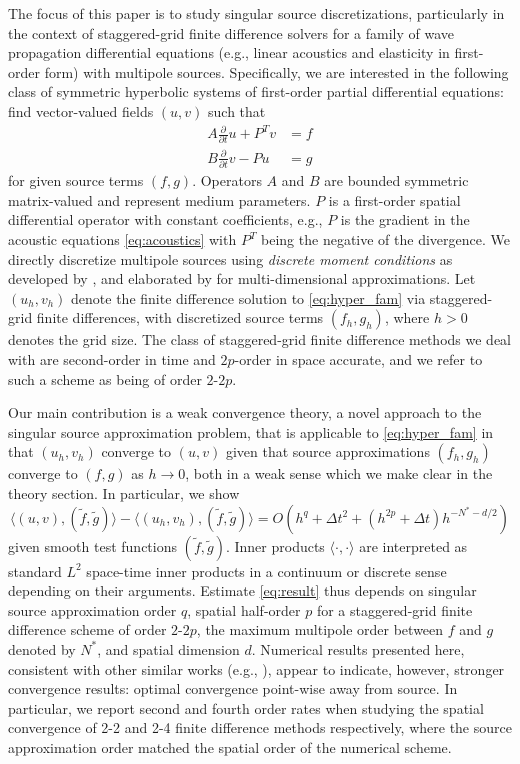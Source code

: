 The focus of this paper is to study singular source discretizations, particularly in the context of staggered-grid finite difference solvers for a family of wave propagation differential equations (e.g., linear acoustics and elasticity in first-order form) with multipole sources.
Specifically, we are interested in the following class of symmetric hyperbolic systems of first-order partial differential equations: find vector-valued fields $(u,v)$ such that
\begin{equation}\label{eq:hyper_fam}
\begin{split}
	A \frac{\partial}{\partial t}u + P^T v &= f \\
	B \frac{\partial}{\partial t}v  - P u & = g
\end{split}
\end{equation}
for given source terms $(f,g)$.
Operators $A$ and $B$ are bounded symmetric matrix-valued and represent medium parameters.
$P$ is a first-order spatial differential operator with constant coefficients, e.g., $P$ is the gradient in the acoustic equations \ref{eq:acoustics} with $P^T$ being the negative of the divergence.
We directly discretize multipole sources using {\em discrete moment conditions} as developed by \cite{Walden:1999}, and elaborated by \cite{TorEng:04} for multi-dimensional approximations.
Let $(u_h,v_h)$ denote the finite difference solution to \ref{eq:hyper_fam} via staggered-grid finite differences, with discretized source terms $(f_h,g_h)$, where $h>0$ denotes the grid size.
The class of staggered-grid finite difference methods we deal with are second-order in time and $2p$-order in space accurate, and we refer to such a scheme as being of order $2$-$2p$.

Our main contribution is a weak convergence theory, a novel approach to the singular source approximation problem, that is applicable to \ref{eq:hyper_fam} in that $(u_h,v_h)$ converge to $(u,v)$ given that source approximations $(f_h,g_h)$ converge to $(f,g)$ as $h\to 0$, both in a weak sense which we make clear in the theory section.
In particular, we show
\begin{equation}\label{eq:result}
	\langle (u,v),(\tilde f,\tilde g) \rangle - \langle (u_h,v_h), (\tilde f,\tilde g)\rangle = O(h^q + \Delta t^2 + (h^{2p}+\Delta t)h^{-N^*-d/2})
\end{equation}
given smooth test functions $(\tilde f,\tilde g)$. 
Inner products $\langle\cdot,\cdot\rangle$ are interpreted as standard $L^2$ space-time inner products in a continuum or discrete sense depending on their arguments.
Estimate \ref{eq:result} thus depends on singular source approximation order $q$, spatial half-order $p$ for a staggered-grid finite difference scheme of order $2$-$2p$, the maximum multipole order between $f$ and $g$ denoted by $N^*$, and spatial dimension $d$.
Numerical results presented here, consistent with other similar works (e.g., \cite{Petersson:2010}), appear to indicate, however, stronger convergence results: optimal convergence point-wise away from source.
In particular, we report second and fourth order rates when studying the spatial convergence of 2-2 and 2-4 finite difference methods respectively, where the source approximation order matched the spatial order of the numerical scheme.

